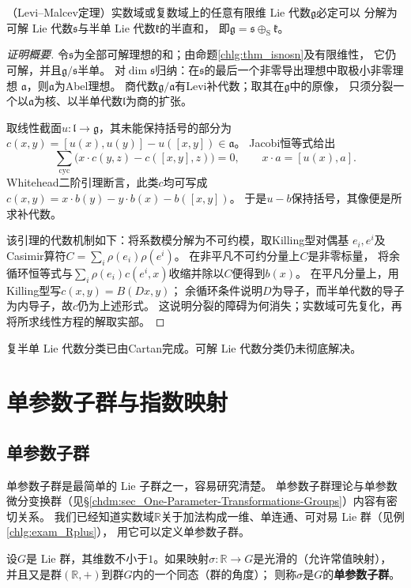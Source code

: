 \begin{theorem}
    （Levi--Malcev定理）实数域或复数域上的任意有限维 Lie 代数$\mathfrak{g}$必定可以
    分解为可解 Lie 代数$\mathfrak{s}$与半单 Lie 代数$\mathfrak{k}$的半直和，
    即$\mathfrak{g}=\mathfrak{s}\oplus_{\mathrm S}\mathfrak{k}$。
\end{theorem}
\begin{proof}[证明概要]
令$\mathfrak s$为全部可解理想的和；由命题\ref{chlg:thm_isnosn}及有限维性，
它仍可解，并且$\mathfrak g/\mathfrak s$半单。
对$\dim\mathfrak s$归纳：在$\mathfrak s$的最后一个非零导出理想中取极小非零理想
$\mathfrak a$，则$\mathfrak a$为Abel理想。
商代数$\mathfrak g/\mathfrak a$有Levi补代数；取其在$\mathfrak g$中的原像，
只须分裂一个以$\mathfrak a$为核、以半单代数$\mathfrak l$为商的扩张。

取线性截面$u:\mathfrak l\to\mathfrak g$，其未能保持括号的部分为
$c(x,y)=[u(x),u(y)]-u([x,y])\in\mathfrak a$。
Jacobi恒等式给出
\[
 \sum_{\mathrm{cyc}}\bigl(x\cdot c(y,z)-c([x,y],z)\bigr)=0,
 \qquad x\cdot a=[u(x),a].
\]
Whitehead二阶引理断言，此类$c$均可写成
$c(x,y)=x\cdot b(y)-y\cdot b(x)-b([x,y])$。
于是$u-b$保持括号，其像便是所求补代数。

该引理的代数机制如下：将系数模分解为不可约模，取Killing型对偶基
$e_i,e^i$及Casimir算符$C=\sum_i\rho(e_i)\rho(e^i)$。
在非平凡不可约分量上$C$是非零标量，
将余循环恒等式与$\sum_i\rho(e_i)c(e^i,x)$收缩并除以$C$便得到$b(x)$。
在平凡分量上，用Killing型写$c(x,y)=B(Dx,y)$；
余循环条件说明$D$为导子，而半单代数的导子为内导子，故$c$仍为上述形式。
这说明分裂的障碍为何消失；实数域可先复化，再将所求线性方程的解取实部。
\end{proof}

复半单 Lie 代数分类已由Cartan完成。可解 Lie 代数分类仍未彻底解决。

\section{单参数子群与指数映射}
\subsection{单参数子群}
单参数子群是最简单的 Lie 子群之一，容易研究清楚。
单参数子群理论与单参数微分变换群（见\S\ref{chdm:sec_One-Parameter-Transformations-Groups}）内容有密切关系。
我们已经知道实数域$\mathbb{R}$关于加法构成一维、单连通、可对易 Lie 群（见例\ref{chlg:exam_Rplus}），
用它可以定义单参数子群。
\begin{definition}
    设$G$是 Lie 群，其维数不小于$1$。如果映射$\sigma:\mathbb{R}\to G$是光滑的（允许常值映射），
    并且又是群$(\mathbb{R},+)$到群$G$内的一个同态（群的角度）；
    则称$\sigma$是$G$的\textbf{单参数子群}。
\end{definition}

